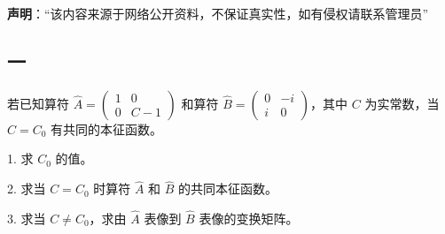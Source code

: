 
\textbf{声明}：“该内容来源于网络公开资料，不保证真实性，如有侵权请联系管理员”

\subsection{一}
若已知算符 $\hat{A} = \begin{pmatrix}
1 & 0 \\
0 & C - 1
\end{pmatrix}$ 和算符 $\hat{B} = \begin{pmatrix}
0 & -i \\
i & 0
\end{pmatrix}$，其中 $C$ 为实常数，当 $C = C_0$ 有共同的本征函数。

1. 求 $C_0$ 的值。

2. 求当 $C = C_0$ 时算符 $\hat{A}$ 和 $\hat{B}$ 的共同本征函数。

3. 求当 $C \neq C_0$，求由 $\hat{A}$ 表像到 $\hat{B}$ 表像的变换矩阵。
